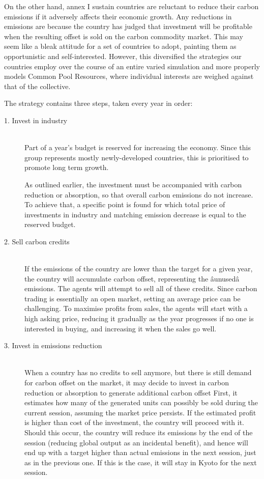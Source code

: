 On the other hand, annex I sustain countries are reluctant to reduce their carbon emissions if it adversely affects their economic growth. Any reductions in emissions are because the country has judged that investment will be profitable when the resulting offset is sold on the carbon commodity market. This may seem like a bleak attitude for a set of countries to adopt, painting them as opportunistic and self-interested. However, this diversified the strategies our countries employ over the course of an entire varied simulation and more properly models Common Pool Resources, where individual interests are weighed against that of the collective.

The strategy contains three steps, taken every year in order:

\begin{description}
\item[1. Invest in industry] \hfill \\
Part of a year's budget is reserved for increasing the economy. Since this group represents mostly newly-developed countries, this is prioritised to promote long term growth.

As outlined earlier, the investment must be accompanied with carbon reduction or absorption, so that overall carbon emissions do not increase. To achieve that, a specific point is found for which total price of investments in industry and matching emission decrease is equal to the reserved budget.

\item[2. Sell carbon credits] \hfill \\
If the emissions of the country are lower than the target for a given year, the country will accumulate carbon offset, representing the âunusedâ emissions. The agents will attempt to sell all of these credits. Since carbon trading is essentially an open market, setting an average price can be challenging. To maximise profits from sales, the agents will start with a high asking price, reducing it gradually as the year progresses if no one is interested in buying, and increasing it when the sales go well.

\item[3. Invest in emissions reduction] \hfill \\
When a country has no credits to sell anymore, but there is still demand for carbon offset on the market, it may decide to invest in carbon reduction or absorption to generate additional carbon offset First, it estimates how many of the generated units can possibly be sold during the current session, assuming the market price persists. If the estimated profit is higher than cost of the investment, the country will proceed with it. Should this occur, the country will reduce its emissions by the end of the session (reducing global output as an incidental benefit), and hence will end up with a target higher than actual emissions in the next session, just as in the previous one. If this is the case, it will stay in Kyoto for the next session.

\end{description}

